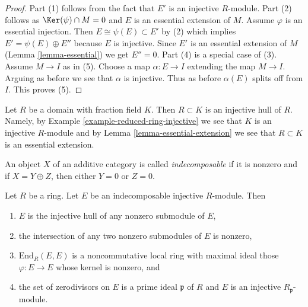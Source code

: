 \begin{proof}
Part (1) follows from the fact that $E'$ is an injective $R$-module.
Part (2) follows as $\Ker(\psi) \cap M = 0$
and $E$ is an essential extension of $M$.
Assume $\varphi$ is an essential injection. Then
$E \cong \psi(E) \subset E'$ by (2) which implies
$E' = \psi(E) \oplus E''$ because $E$ is injective.
Since $E'$ is an essential extension of
$M$ (Lemma \ref{lemma-essential}) we get $E'' = 0$.
Part (4) is a special case of (3).
Assume $M \to I$ as in (5).
Choose a map $\alpha : E \to I$ extending the map $M \to I$.
Arguing as before we see that $\alpha$ is injective.
Thus as before $\alpha(E)$ splits off from $I$.
This proves (5).
\end{proof}

\begin{example}
\label{example-injective-hull-domain}
Let $R$ be a domain with fraction field $K$. Then $R \subset K$ is an
injective hull of $R$. Namely, by
Example \ref{example-reduced-ring-injective} we see that $K$ is an injective
$R$-module and by Lemma \ref{lemma-essential-extension} we see that
$R \subset K$ is an essential extension.
\end{example}

\begin{definition}
\label{definition-indecomposable}
An object $X$ of an additive category is called {\it indecomposable}
if it is nonzero and if $X = Y \oplus Z$, then either $Y = 0$ or $Z = 0$.
\end{definition}

\begin{lemma}
\label{lemma-indecomposable-injective}
Let $R$ be a ring. Let $E$ be an indecomposable injective $R$-module.
Then
\begin{enumerate}
\item $E$ is the injective hull of any nonzero submodule of $E$,
\item the intersection of any two nonzero submodules of $E$ is nonzero,
\item $\text{End}_R(E, E)$ is a noncommutative local ring with maximal
ideal those $\varphi : E \to E$ whose kernel is nonzero, and
\item the set of zerodivisors on $E$ is a prime ideal $\mathfrak p$ of $R$
and $E$ is an injective $R_\mathfrak p$-module.
\end{enumerate}
\end{lemma}

